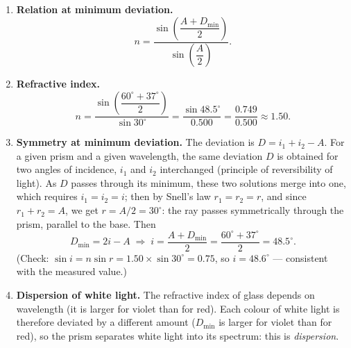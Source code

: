 \documentclass[11pt]{article}
\begin{document}
\begin{corrige}
\begin{enumerate}
\item \textbf{Relation at minimum deviation.}
\[ n = \frac{\sin\left(\dfrac{A + D_{\min}}{2}\right)}{\sin\left(\dfrac{A}{2}\right)}. \]

\item \textbf{Refractive index.}
\[ n = \frac{\sin\left(\dfrac{60^{\circ}+37^{\circ}}{2}\right)}{\sin 30^{\circ}} = \frac{\sin 48.5^{\circ}}{0.500} = \frac{0.749}{0.500} \approx 1.50. \]

\item \textbf{Symmetry at minimum deviation.} The deviation is $D = i_{1} + i_{2} - A$. For a given prism and a given wavelength, the same deviation $D$ is obtained for two angles of incidence, $i_{1}$ and $i_{2}$ interchanged (principle of reversibility of light). As $D$ passes through its minimum, these two solutions merge into one, which requires $i_{1} = i_{2} = i$; then by Snell's law $r_{1} = r_{2} = r$, and since $r_{1}+r_{2} = A$, we get $r = A/2 = 30^{\circ}$: the ray passes symmetrically through the prism, parallel to the base. Then
\[ D_{\min} = 2i - A \;\Rightarrow\; i = \frac{A + D_{\min}}{2} = \frac{60^{\circ}+37^{\circ}}{2} = 48.5^{\circ}. \]
(Check: $\sin i = n\sin r = 1.50\times\sin 30^{\circ} = 0.75$, so $i = 48.6^{\circ}$ — consistent with the measured value.)

\item \textbf{Dispersion of white light.} The refractive index of glass depends on wavelength (it is larger for violet than for red). Each colour of white light is therefore deviated by a different amount ($D_{\min}$ is larger for violet than for red), so the prism separates white light into its spectrum: this is \emph{dispersion}.
\end{enumerate}
\end{corrige}
\end{document}
